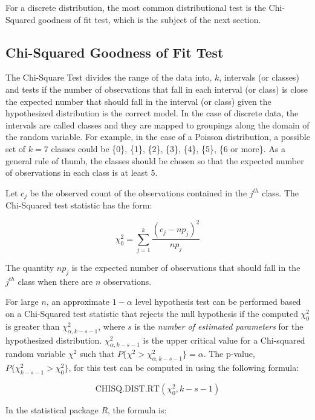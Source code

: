 \documentclass[
]{book}
\theoremstyle{definition}
\theoremstyle{definition}
\theoremstyle{definition}
\theoremstyle{definition}
\theoremstyle{remark}
\begin{document}
For a discrete distribution, the most common distributional test is the Chi-Squared goodness of fit test, which is the subject of the next section.

\hypertarget{subsub:chisqGOF}{%
\subsection{Chi-Squared Goodness of Fit Test}\label{subsub:chisqGOF}}

The Chi-Square Test divides the range of the data into, \(k\), intervals (or classes)
and tests if the number of observations that fall in each interval (or class) is
close the expected number that should fall in the interval (or class) given the
hypothesized distribution is the correct model. In the case of discrete data, the intervals are called classes and they are mapped to groupings along the domain of the random variable. For example, in the case of a Poisson distribution, a possible set of \(k=7\) classes could be \{0\}, \{1\}, \{2\}, \{3\}, \{4\}, \{5\}, \{6 or more\}. As a general rule of thumb, the classes should be chosen so that the expected number of observations in each class is at least 5.

Let \(c_{j}\) be the observed count of the observations contained in
the \(j^{th}\) class. The Chi-Squared test statistic has the form:

\begin{equation}
\chi^{2}_{0} = \sum\limits_{j=1}^{k} \frac{\left( c_{j} - np_{j} \right)^{2}}{np_{j}}
\label{eq:chisq}
\end{equation}

The quantity \(np_{j}\) is the expected number of observations that should
fall in the \(j^{th}\) class when there are \(n\) observations.

For large \(n\), an approximate \(1-\alpha\) level hypothesis test can be
performed based on a Chi-Squared test statistic that rejects the null
hypothesis if the computed \(\chi^{2}_{0}\) is greater than
\(\chi^{2}_{\alpha, k-s-1}\), where \(s\) is the \emph{number of estimated
parameters} for the hypothesized distribution. \(\chi^{2}_{\alpha, k-s-1}\)
is the upper critical value for a Chi-squared random variable \(\chi^{2}\)
such that \(P\{\chi^{2} > \chi^{2}_{\alpha, k-s-1}\} = \alpha\). The
p-value, \(P\{\chi^{2}_{k-s-1} > \chi^{2}_{0}\}\), for this test can be
computed in using the following formula:

\[\text{CHISQ.DIST.RT}(\chi^{2}_{0},k-s-1)\]

In the statistical package \(R\), the formula is:
\end{document}
